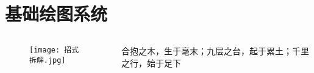 

\section{基础绘图系统}
\begin{frame}
  \vspace{40pt}
  \begin{columns}
    \begin{column}{.4\textwidth}
      \begin{figure}
        \centering \texttt{[image: 招式拆解.jpg]}
      \end{figure}
    \end{column}

    \begin{column}{.6\textwidth}
      \begin{ornamentblock}
        {合抱之木，生于毫末；九层之台，起于累土；千里之行，始于足下\\
          }
      \end{ornamentblock}
    \end{column}
  \end{columns}
\end{frame}

